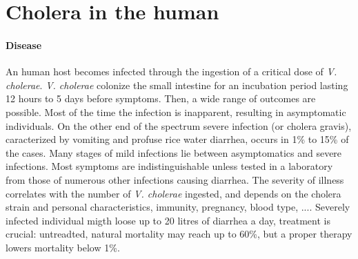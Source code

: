 \section{Cholera in the human} 
\paragraph{Disease} An human host becomes infected through the ingestion of a critical dose of \emph{V. cholerae}\cite{Kaper:Cholera:1995,Nelson:CholeraTransmissionHost:2009}. \textit{V. cholerae} colonize the small intestine for an incubation period lasting 12 hours to 5 days\cite{Azman:IncubationPeriodCholera:2013} before symptoms. Then, a wide range of outcomes are possible. Most of the time the infection is inapparent, resulting in asymptomatic individuals. On the other end of the spectrum severe infection (or cholera gravis), caracterized by vomiting and profuse rice water diarrhea, occurs in 1\% to 15\% of the cases. Many stages of mild infections lie between asymptomatics and severe infections.  Most symptoms are indistinguishable unless tested in a laboratory from those of numerous other infections causing diarrhea\cite{King:InapparentInfectionsCholera:2008, Kaper:Cholera:1995, Nelson:CholeraTransmissionHost:2009,vandeLinde:ObservationsSpreadCholera:1965,Mccormack:CommunityStudyInapparent:1969}.  The severity of illness correlates with the number of \textit{V. cholerae} ingested\cite{Brouwer:DoseresponseRelationshipsEnvironmentally:2017}, and depends on the cholera strain and personal characteristics, immunity, pregnancy, blood type, ...\cite{WHO:CholeraVaccinesWHO:2017,Azman:IncubationPeriodCholera:2013}.%
Severely infected individual migth loose up to 20 litres  of diarrhea a day, treatment is crucial: untreadted, natural mortality may reach up to 60\%, but a proper therapy lowers mortality below 1\%\cite{Luquero:MortalityRatesCholera:2016}.

